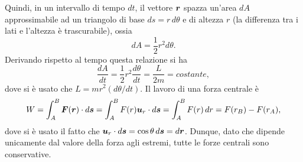 Quindi, in un intervallo di tempo $dt$, il vettore $\bm{r}$ spazza un'area $dA$ approssimabile ad un triangolo di base $ds=r\,d\theta$ e di altezza $r$ (la differenza tra i lati e l'altezza è trascurabile), ossia
\begin{equation}
    dA=\frac{1}{2}r^2d\theta.
\end{equation}
Derivando rispetto al tempo questa relazione si ha
\begin{equation}
    \frac{dA}{dt}=\frac{1}{2}r^2\frac{d\theta}{dt}=\frac{L}{2m}=costante,
\end{equation}
dove si è usato che $L=mr^2(d\theta/dt)$. Il lavoro di una forza centrale è
\begin{equation}
    W=\int_A^B\bm{F}(\bm{r})\cdot d\bm{s}=\int_A^BF(r)\bm{u}_r\cdot d\bm{s}=\int_A^BF(r)\,dr=F(r_B)-F(r_A),
\end{equation}
dove si è usato il fatto che $\bm{u}_r\cdot d\bm{s}=\cos\theta\,d\bm{s}=d\bm{r}$. Dunque, dato che dipende unicamente dal valore della forza agli estremi, tutte le forze centrali sono conservative. 